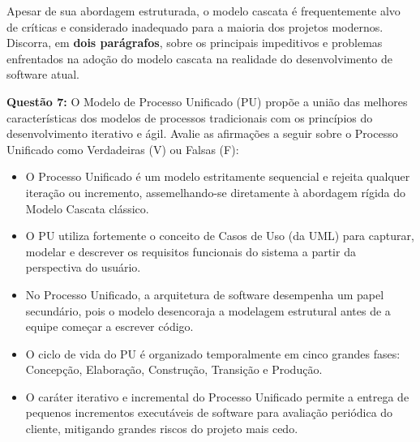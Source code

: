 \documentclass[12pt,a4paper]{article}
\newcommand{\resposta}[1]{
\noindent
\framebox[\textwidth]{
\begin{minipage}{0.98\textwidth}
\vspace*{#1}\null
\end{minipage}
}
}
\begin{document}
\begin{center}
\end{center}

\vspace{0.4cm}
Apesar de sua abordagem estruturada, o modelo cascata é frequentemente alvo de críticas e considerado inadequado para a maioria dos projetos modernos. Discorra, em \textbf{dois parágrafos}, sobre os principais impeditivos e problemas enfrentados na adoção do modelo cascata na realidade do desenvolvimento de software atual.

\vspace{0.2cm}
\resposta{8cm}

\vspace{0.8cm}
\textbf{Questão 7:} O Modelo de Processo Unificado (PU) propõe a união das melhores características dos modelos de processos tradicionais com os princípios do desenvolvimento iterativo e ágil. Avalie as afirmações a seguir sobre o Processo Unificado como Verdadeiras (V) ou Falsas (F):

\begin{itemize}[itemsep=0.3cm]
    \item[{[ \ \ ]}] O Processo Unificado é um modelo estritamente sequencial e rejeita qualquer iteração ou incremento, assemelhando-se diretamente à abordagem rígida do Modelo Cascata clássico.
    \item[{[ \ \ ]}] O PU utiliza fortemente o conceito de Casos de Uso (da UML) para capturar, modelar e descrever os requisitos funcionais do sistema a partir da perspectiva do usuário.
    \item[{[ \ \ ]}] No Processo Unificado, a arquitetura de software desempenha um papel secundário, pois o modelo desencoraja a modelagem estrutural antes de a equipe começar a escrever código.
    \item[{[ \ \ ]}] O ciclo de vida do PU é organizado temporalmente em cinco grandes fases: Concepção, Elaboração, Construção, Transição e Produção.
    \item[{[ \ \ ]}] O caráter iterativo e incremental do Processo Unificado permite a entrega de pequenos incrementos executáveis de software para avaliação periódica do cliente, mitigando grandes riscos do projeto mais cedo.
\end{itemize}
\end{document}
